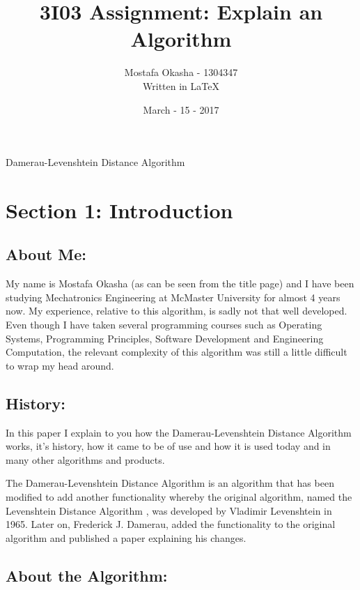 \documentclass[12pt]{article}
\title{3I03 Assignment: Explain an Algorithm}
\author{}
\date{March - 15 - 2017}
\author{Mostafa Okasha - 1304347 \\ Written in \LaTeX{}}
\begin{document}
\maketitle
\vspace{50mm} %
\setlength{\parindent}{3.5cm}
\hangindent=3.5cm 
\hspace{16 mm} Damerau-Levenshtein Distance Algorithm

\newpage

\section*{Section 1: Introduction}
\subsection*{About Me:}
\setlength{\parindent}{1.5cm}
\vspace{5mm} %

My name is Mostafa Okasha (as can be seen from the title page) and I have been studying Mechatronics Engineering at McMaster University for almost 4 years now. My experience, relative to this algorithm, is sadly not that well developed. Even though I have taken several programming courses such as Operating Systems, Programming Principles, Software Development and Engineering Computation, the relevant complexity of this algorithm was still a little difficult to wrap my head around.\cite{mostafaokasha}
    
\subsection*{History:}

In this paper I explain to you how the Damerau-Levenshtein Distance Algorithm works, it's history, how it came to be of use and how it is used today and in many other algorithms and products.

\vspace{2.5mm} %

The Damerau-Levenshtein Distance Algorithm is an algorithm that has been modified to add another functionality whereby the original algorithm, named the Levenshtein Distance Algorithm , was developed by Vladimir Levenshtein in 1965.\cite{wiki1} Later on, Frederick J. Damerau, added the functionality to the original algorithm and published a paper explaining his changes. \cite{article}

\subsection*{About the Algorithm:}
\end{document}
